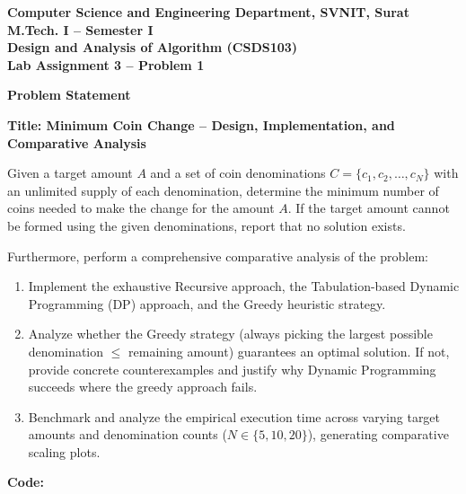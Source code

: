 \documentclass[12pt]{article}
\begin{document}

\begin{center}
\textbf{Computer Science and Engineering Department, SVNIT, Surat}\\
\textbf{M.Tech. I -- Semester I}\\
\textbf{Design and Analysis of Algorithm (CSDS103)}\\
\textbf{Lab Assignment 3 -- Problem 1}
\end{center}

\vspace{0.4cm}

\textbf{Problem Statement}

\textbf{Title: Minimum Coin Change -- Design, Implementation, and Comparative Analysis}

Given a target amount $A$ and a set of coin denominations $C = \{c_1, c_2, \dots, c_N\}$ with an unlimited supply of each denomination, determine the minimum number of coins needed to make the change for the amount $A$. If the target amount cannot be formed using the given denominations, report that no solution exists.

Furthermore, perform a comprehensive comparative analysis of the problem:
\begin{enumerate}
    \item Implement the exhaustive Recursive approach, the Tabulation-based Dynamic Programming (DP) approach, and the Greedy heuristic strategy.
    \item Analyze whether the Greedy strategy (always picking the largest possible denomination $\le$ remaining amount) guarantees an optimal solution. If not, provide concrete counterexamples and justify why Dynamic Programming succeeds where the greedy approach fails.
    \item Benchmark and analyze the empirical execution time across varying target amounts and denomination counts ($N \in \{5, 10, 20\}$), generating comparative scaling plots.
\end{enumerate}

\vspace{0.3cm}

\textbf{Code:}
\end{document}
